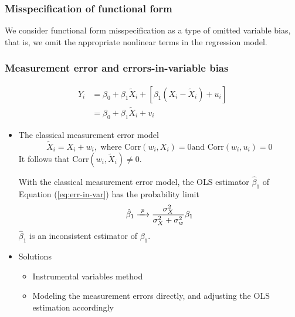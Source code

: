 \documentclass[a4paper,10pt]{article}
\newcommand{\corr}{\mathrm{Corr}}
\newcommand{\rarrowd}[1]{\xrightarrow{\text{ \textit #1 }}}
\begin{document}
\subsubsection*{Misspecification of functional form}
\label{sec:orgbd360d4}

We consider functional form misspecification as a type of omitted
variable bias, that is, we omit the appropriate nonlinear terms in the
regression model. 

\subsubsection*{Measurement error and errors-in-variable bias}
\label{sec:org2022ac9}

\begin{equation}
\begin{split}
Y_i &= \beta_0 + \beta_1 \tilde{X}_i + [\beta_1 (X_i - \tilde{X}_i) + u_i] \\
&= \beta_0 + \beta_1 \tilde{X}_i + v_i \label{eq:err-in-var}
\end{split}
\end{equation}

\begin{itemize}
\item The classical measurement error model
\label{sec:orgf4d01dd}
\begin{equation}
\label{eq:eiv-class}
\tilde{X}_i = X_i + w_i, \text{ where } \corr(w_i, X_i) = 0 \text{
and } \corr(w_i, u_i) = 0
\end{equation}
It follows that \(\corr(w_i, \tilde{X}_i) \neq 0\). 

With the classical measurement error model, the OLS estimator
\(\hat{\beta}_1\) of Equation (\ref{eq:err-in-var}) has the probability
limit
\begin{equation}
\label{eq:eiv-lim}
\hat{\beta}_1 \rarrowd{p} \frac{\sigma^2_X}{\sigma^2_X + \sigma^2_w}\beta_1
\end{equation}
\(\hat{\beta}_1\) is an inconsistent estimator of \(\beta_1\). 

\item Solutions
\label{sec:org17e1291}
\begin{itemize}
\item Instrumental variables method
\label{sec:orgce16161}
\item Modeling the measurement errors directly, and adjusting the OLS estimation accordingly
\label{sec:orgb27026b}
\end{itemize}
\end{itemize}
\end{document}
